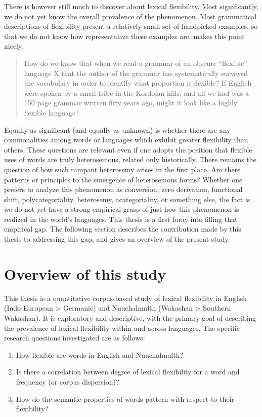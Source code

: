 There is however still much to discover about lexical flexibility. Most significantly, we do not yet know the overall prevalence of the phenomenon. Most grammatical descriptions of flexibility present a relatively small set of handpicked examples, so that we do not know how representative these examples are. \textcite[70]{Croft2001} makes this point nicely:

\blockquote[{\cite[70]{Croft2001}}]{How do we know that when we read a grammar of an obscure \enquote{flexible} language X that the author of the grammar has systematically surveyed the vocabulary in order to identify what proportion is flexible? If English were spoken by a small tribe in the Kordofan hills, and all we had was a 150 page grammar written fifty years ago, might it look like a highly flexible language?}

\noindent Equally as significant (and equally as unknown) is whether there are any commonalities among words or languages which exhibit greater flexibility than others. These questions are relevant even if one adopts the position that flexible uses of words are truly heterosemous, related only historically. There remains the question of how such rampant heterosemy arises in the first place. Are there patterns or principles to the emergence of heterosemous forms? Whether one prefers to analyze this phenomenon as conversion, zero derivation, functional shift, polycategoriality, heterosemy, acategoriality, or something else, the fact is we do not yet have a strong empirical grasp of just how this phenomenon is realized in the world's languages. This thesis is a first foray into filling that empirical gap. The following section describes the contribution made by this thesis to addressing this gap, and gives an overview of the present study.

\section{Overview of this study}
\label{sec:1.3}

This thesis is a quantitative corpus-based study of lexical flexibility in English (Indo-European > Germanic) and Nuuchahnulth (Wakashan > Southern Wakashan). It is exploratory and descriptive, with the primary goal of describing the prevalence of lexical flexibility within and across languages. The specific research questions investigated are as follows:

\begin{enumerate}[
  label      = {\textbf{R\arabic*:}},
  leftmargin = *,
  ref        = {R\arabic*}
]
  \item\label{R1} How flexible are words in English and Nuuchahnulth?
  \item\label{R2} Is there a correlation between degree of lexical flexibility for a word and frequency (or corpus dispersion)?
  \item\label{R3} How do the semantic properties of words pattern with respect to their flexibility?
\end{enumerate}

